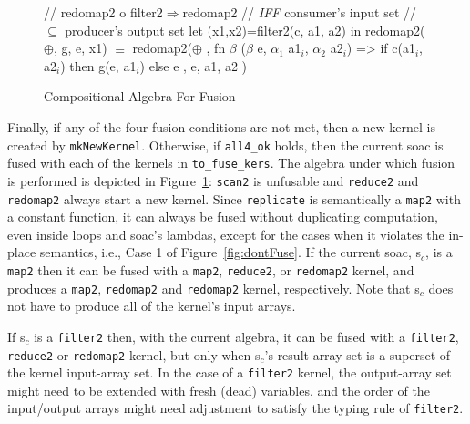 \documentclass{sigplanconf}  %
\newcommand{\emp}[1]{\textcolor{DikuRed}{ #1}}
\newcommand{\emphh}[1]{\textcolor{CosGreen}{ #1}}
\newcommand{\mymath}[1]{$ #1 $}
\newcommand{\myindx}[1]{_{#1}}
\begin{document}
\begin{figure}[bt]
{\begin{minipage}{0.48\columnwidth}
\begin{colorcode}
//\emp{redomap2 o filter2\mymath{\Rightarrow}redomap2}
//\emp{{\em{}IFF} consumer's input set}
//\emp{  \mymath{\subseteq} producer's output set}
let (x1,x2)=filter2(c, a1, a2)
in  redomap2(\mymath{\oplus}, g, e, x1)
    \emphh{\mymath{\equiv}}
redomap2(\mymath{\oplus}
, fn \mymath{\beta} (\mymath{\beta} e, \mymath{\alpha\myindx{1}} a1\mymath{\myindx{i}}, \mymath{\alpha\myindx{2}} a2\mymath{\myindx{i}})
   => if c(a1\mymath{\myindx{i}}, a2\mymath{\myindx{i}})
      then g(e, a1\mymath{\myindx{i}}) else e
, e, a1, a2 )
\end{colorcode}
\end{minipage}
} 
\caption{Compositional Algebra For Fusion}
\label{fig:CompatFuse}
\end{figure}



Finally, if any of the four fusion conditions are not met, 
then a new kernel is created by {\tt mkNewKernel}.
Otherwise, if {\tt all4\_ok} holds, then the current {\sc soac}
is fused with each of the kernels in {\tt to\_fuse\_kers}.
%
The algebra under which fusion is performed is depicted in Figure~\ref{fig:CompatFuse}:
{\tt scan2} is unfusable and {\tt reduce2} and {\tt redomap2} always 
start a new kernel.  Since {\tt replicate} is semantically a {\tt map2} 
with a constant function, it can always be fused without duplicating
computation, even inside loops and {\sc soac}'s lambdas, except for the 
cases when it violates the in-place semantics, i.e., \emp{Case 1} of 
Figure~\ref{fig:dontFuse}.
%
If the current {\sc soac}, {\sc s}$_c$, is a {\tt map2} then it can be fused 
with a {\tt map2}, {\tt reduce2}, or {\tt redomap2} kernel, and produces 
a {\tt map2}, {\tt redomap2} and {\tt redomap2} kernel, respectively.
Note that {\sc s}$_c$ does not have to produce all of the kernel's input arrays.

If {\sc s}$_c$ is a {\tt filter2} then, with the current algebra, it can be fused
with a {\tt filter2}, {\tt reduce2} or {\tt redomap2} kernel, but only when
{\sc s}$_c$'s result-array set is a superset of the kernel input-array set. 
In the case of a {\tt filter2} kernel, the output-array set might need to 
be extended with fresh (dead) variables, and the order of the input/output
arrays might need adjustment to satisfy the typing rule of {\tt filter2}.
\end{document}

